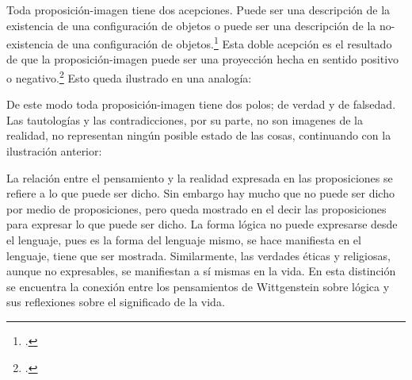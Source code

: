 Toda proposición-imagen tiene dos acepciones. Puede ser una descripción de
la existencia de una configuración de objetos o puede ser una descripción de la
no-existencia de una configuración de objetos.\footcite[cf.~][p.~72]{IWT} 
Esta doble acepción es el resultado de que la proposición-imagen puede ser una
proyección hecha en sentido positivo o negativo.\footcite[cf.~][p.~74]{IWT} Esto
queda ilustrado en una analogía:


De este modo toda proposición-imagen tiene dos polos; de verdad y de falsedad.
Las tautologías y las contradicciones, por su parte, no son imagenes de la
realidad, no representan ningún posible estado de las cosas, continuando con la ilustración anterior:


La relación entre el pensamiento
y la realidad expresada en las proposiciones se refiere a lo que puede ser
dicho. Sin embargo hay mucho que no puede ser dicho por medio de proposiciones,
pero queda mostrado en el decir las proposiciones para expresar lo que puede ser
dicho. La forma lógica no puede expresarse desde el lenguaje, pues es la forma
del lenguaje mismo, se hace manifiesta en el lenguaje, tiene que ser mostrada.
Similarmente, las verdades éticas y religiosas, aunque no expresables, se
manifiestan a sí mismas en la vida. En esta distinción se encuentra la conexión
entre los pensamientos de Wittgenstein sobre lógica y sus reflexiones sobre el
significado de la vida.


